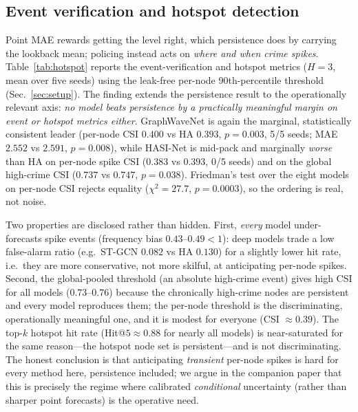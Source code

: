 \documentclass[11pt,conference]{IEEEtran}
\begin{document}
\subsection{Event verification and hotspot detection}\label{sec:hotspot}
Point MAE rewards getting the level right, which persistence does by carrying
the lookback mean; policing instead acts on \emph{where and when crime spikes}.
Table~\ref{tab:hotspot} reports the event-verification and hotspot metrics
($H{=}3$, mean over five seeds) using the leak-free per-node 90th-percentile
threshold (Sec.~\ref{sec:setup}). The finding extends the persistence result to
the operationally relevant axis: \emph{no model beats persistence by a
practically meaningful margin on event or hotspot metrics either}. GraphWaveNet
is again the marginal, statistically consistent leader (per-node CSI $0.400$
vs HA $0.393$, $p{=}0.003$, 5/5 seeds; MAE $2.552$ vs $2.591$, $p{=}0.008$),
while HASI-Net is mid-pack and marginally \emph{worse} than HA on per-node spike
CSI ($0.383$ vs $0.393$, 0/5 seeds) and on the global high-crime CSI
($0.737$ vs $0.747$, $p{=}0.038$). Friedman's test over the eight models on
per-node CSI rejects equality ($\chi^2{=}27.7$, $p{=}0.0003$), so the ordering
is real, not noise.

Two properties are disclosed rather than hidden. First, \emph{every} model
under-forecasts spike events (frequency bias $0.43$--$0.49{<}1$): deep models
trade a low false-alarm ratio (e.g.\ ST-GCN $0.082$ vs HA $0.130$) for a
slightly lower hit rate, i.e.\ they are more conservative, not more skilful, at
anticipating per-node spikes. Second, the global-pooled threshold (an absolute
high-crime event) gives high CSI for all models ($0.73$--$0.76$) because the
chronically high-crime nodes are persistent and every model reproduces them;
the per-node threshold is the discriminating, operationally meaningful one,
and it is modest for everyone (CSI $\approx0.39$). The top-$k$ hotspot hit rate
(Hit@$5{\approx}0.88$ for nearly all models) is near-saturated for the same
reason---the hotspot node set is persistent---and is not discriminating. The
honest conclusion is that anticipating \emph{transient} per-node spikes is
hard for every method here, persistence included; we argue in the companion
paper that this is precisely the regime where calibrated \emph{conditional}
uncertainty (rather than sharper point forecasts) is the operative need.
\end{document}

